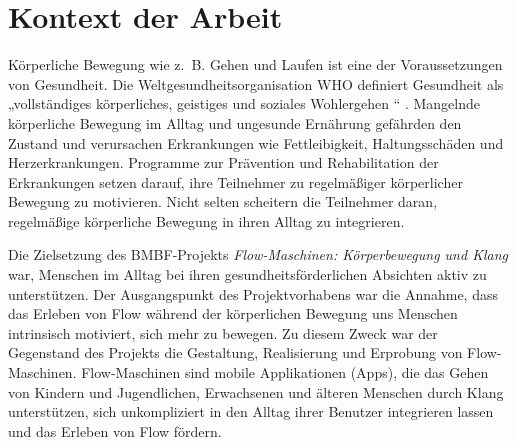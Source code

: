 

\section{Kontext der Arbeit} 

\label{sec:kontext_der_arbeit}

Körperliche Bewegung wie z.~B. Gehen und Laufen ist eine der Voraussetzungen von Gesundheit. Die Weltgesundheitsorganisation \acs{WHO} definiert Gesundheit als „vollständiges körperliches, geistiges und soziales Wohlergehen \textellipsis“ \citep[S.~100]{WorldHealthOrganization1948}. Mangelnde körperliche Bewegung im Alltag und ungesunde Ernährung gefährden den Zustand und verursachen Erkrankungen wie Fettleibigkeit, Haltungsschäden und Herzerkrankungen. Programme zur Prävention und Rehabilitation der Erkrankungen setzen darauf, ihre Teilnehmer zu regelmäßiger körperlicher Bewegung zu motivieren. Nicht selten scheitern die Teilnehmer daran, regelmäßige körperliche Bewegung in ihren Alltag zu integrieren.

Die Zielsetzung des \acs{BMBF}-Projekts \emph{Flow-Maschinen: Körperbewegung und Klang} war, Menschen im Alltag bei ihren gesundheitsförderlichen Absichten aktiv zu unterstützen. Der Ausgangspunkt des Projektvorhabens war die Annahme, dass das Erleben von Flow während der körperlichen Bewegung uns Menschen intrinsisch motiviert, sich mehr zu bewegen. Zu diesem Zweck war der Gegenstand des Projekts die Gestaltung, Realisierung und Erprobung von Flow-Maschinen. Flow-Maschinen sind mobile Applikationen (Apps), die das Gehen von Kindern und Jugendlichen, Erwachsenen und älteren Menschen durch Klang unterstützen, sich unkompliziert in den Alltag ihrer Benutzer integrieren lassen und das Erleben von Flow fördern.

